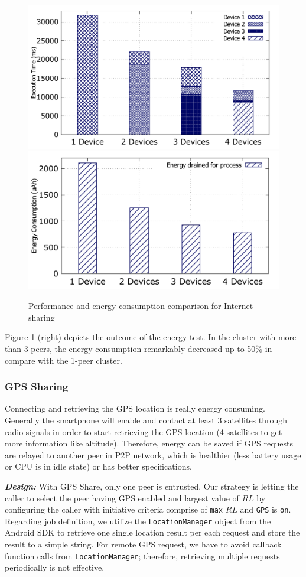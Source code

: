 \documentclass{sig-alternate}
\begin{document}
\begin{figure}
	\centering
		\includegraphics[width=.43\textwidth]{data/net_perf_01.pdf}
		\includegraphics[width=.46\textwidth]{data/net_energy.pdf}
	\caption{Performance and energy consumption comparison for Internet sharing}
	\label{fig:net_clusters_perf}
\end{figure}

Figure \ref{fig:net_clusters_perf} (right) depicts the outcome of the energy test. In the cluster with more than 3 peers, the energy consumption remarkably decreased up to 50\% in compare with the 1-peer cluster.

\subsubsection{GPS Sharing}
Connecting and retrieving the GPS location is really energy consuming. Generally the smartphone will enable and contact at least 3 satellites through radio signals in order to start retrieving the GPS location (4 satellites to get more information like altitude). Therefore, energy can be saved if GPS requests are relayed to another peer in P2P network, which is healthier (less battery usage or CPU is in idle state) or has better specifications.

\textbf{\emph{Design:}}
With GPS Share, only one peer is entrusted. Our strategy is letting the caller to select the peer having GPS enabled and largest value of $RL$ by configuring the caller with initiative criteria comprise of \texttt{max} $RL$ and \texttt{GPS} is \texttt{on}. Regarding job definition, we utilize the \texttt{LocationManager} object from the Android SDK to retrieve one single location result per each request and store the result to a simple string. For remote GPS request, we have to avoid callback function calls from \texttt{LocationManager}; therefore, retrieving multiple requests periodically is not effective.
\end{document}
